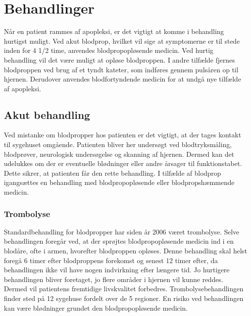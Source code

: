 \section{Behandlinger}
Når en patient rammes af apopleksi, er det vigtigt at komme i behandling hurtigst muligt. Ved akut blodprop, hvilket vil sige at symptomerne er til stede inden for 4 1/2 time, anvendes blodpropopløsende medicin. Ved hurtig behandling vil det være muligt at opløse blodproppen. I andre tilfælde fjernes blodproppen ved brug af et tyndt kateter, som indføres gennem pulsåren op til hjernen. Derudover anvendes blodfortyndende medicin for at undgå nye tilfælde af apopleksi. \cite{Hjerteforeningen2014} \cite{Kruuse2014a}

\subsection{Akut behandling}
Ved mistanke om blodpropper hos patienten er det vigtigt, at der tages kontakt til sygehuset omgående. Patienten bliver her undersøgt ved blodtryksmåling, blodprøver, neurologisk undersøgelse og skanning af hjernen. Dermed kan det udelukkes om der er eventuelle blødninger eller andre årsager til funktionstabet. Dette  sikrer, at patienten får den rette behandling. I tilfælde af blodprop igangsættes en behandling med blodpropopløsende eller blodpropshæmmende medicin. \cite{Hjerteforeningen2014} \cite{Kruuse2014a} 

\subsubsection{Trombolyse}
Standardbehandling for blodpropper har siden år 2006 været trombolyse. Selve behandlingen foregår ved, at der sprøjtes blodpropopløsende medicin ind i en blodåre, ofte i armen, hvorefter blodproppen opløses. Denne behandling skal helst foregå 6 timer efter blodproppens forekomst og senest 12 timer efter, da behandlingen ikke vil have nogen indvirkning efter længere tid. Jo hurtigere behandlingen bliver foretaget, jo flere områder i hjernen vil kunne reddes. Dermed vil patientens fremtidige livskvalitet forbedres. Trombolysebehandlingen finder sted på 12 sygehuse fordelt over de 5 regioner. En risiko ved behandlingen kan være blødninger grundet den blodpropopløsende medicin.\cite{Hjernesagen2015b} 

